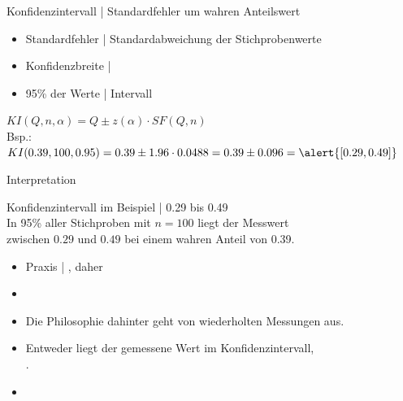 \begin{frame}
  {Konfidenzintervall | Standardfehler um wahren Anteilswert}
  \begin{itemize}[<+->]
    \item Standardfehler | \alert{Standardabweichung} der Stichprobenwerte
    \item \alert{Konfidenzbreite} | 
    \item 95\% der Werte | Intervall 
  \end{itemize}
  \Doppelzeile
  \begin{center}
    \alert{$KI(Q,n,\alpha)=Q\pm z(\alpha)\cdot SF(Q,n)$}\\
    \Zeile
  Bsp.: $KI(0.39,100,0.95)=0.39\pm1.96\cdot 0.0488=0.39\pm0.096=\alert{[0.29, 0.49]}$
  \end{center}
\end{frame}

\begin{frame}
  {Interpretation}
  \begin{center}
    Konfidenzintervall im Beispiel | \alert{0.29 bis 0.49}\\
    \Halbzeile
    In 95\% aller Stichproben mit $n=100$ liegt der Messwert\\
    zwischen $0.29$ und $0.49$ bei einem wahren Anteil von 0.39.
  \end{center}
  \Zeile
  \begin{itemize}[<+->]
    \item Praxis | , daher 
    \Zeile
    \item {}
    \item Die Philosophie dahinter geht von \alert{wiederholten Messungen} aus.
      \Halbzeile
    \item Entweder liegt der gemessene Wert im Konfidenzintervall,\\
      .
      \Halbzeile
    \item {}
  \end{itemize}
\end{frame}


